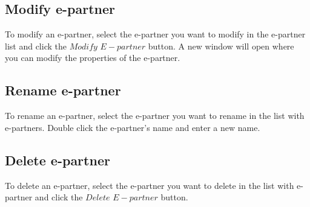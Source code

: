 \documentclass[a4paper]{article}
\begin{document}
\subsection{Modify e-partner}
To modify an e-partner, select the e-partner you want to modify in the e-partner list and click the $Modify$ $E-partner$ button. A new window will open where you can modify the properties of the e-partner.

\subsection{Rename e-partner}
To rename an e-partner, select the e-partner you want to rename in the list with e-partners. Double click the e-partner's name and enter a new name. %

\subsection{Delete e-partner}
To delete an e-partner, select the e-partner you want to delete in the list with e-partner and click the $Delete$ $E-partner$ button.
\end{document}
